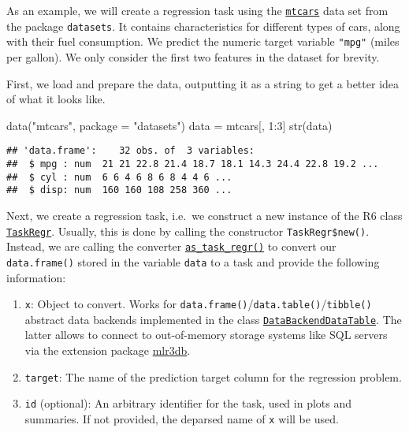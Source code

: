 \documentclass[
]{scrbook}
\newenvironment{Shaded}{\begin{snugshade}}{\end{snugshade}}
\newcommand{\AttributeTok}[1]{\textcolor[rgb]{0.77,0.63,0.00}{#1}}
\newcommand{\DecValTok}[1]{\textcolor[rgb]{0.00,0.00,0.81}{#1}}
\newcommand{\FunctionTok}[1]{\textcolor[rgb]{0.00,0.00,0.00}{#1}}
\newcommand{\NormalTok}[1]{#1}
\newcommand{\OtherTok}[1]{\textcolor[rgb]{0.56,0.35,0.01}{#1}}
\newcommand{\SpecialCharTok}[1]{\textcolor[rgb]{0.00,0.00,0.00}{#1}}
\newcommand{\StringTok}[1]{\textcolor[rgb]{0.31,0.60,0.02}{#1}}
\providecommand{\tightlist}{%
  \setlength{\itemsep}{0pt}\setlength{\parskip}{0pt}}
\renewenvironment{Shaded} {\begin{snugshade}\small} {\end{snugshade}}
\begin{document}
As an example, we will create a regression task using the \href{https://www.rdocumentation.org/packages/datasets/topics/mtcars}{\texttt{mtcars}} data set from the package \texttt{datasets}.
It contains characteristics for different types of cars, along with their fuel consumption.
We predict the numeric target variable \texttt{"mpg"} (miles per gallon).
We only consider the first two features in the dataset for brevity.

First, we load and prepare the data, outputting it as a string to get a better idea of what it looks like.

\begin{Shaded}
\begin{Highlighting}[]
\FunctionTok{data}\NormalTok{(}\StringTok{"mtcars"}\NormalTok{, }\AttributeTok{package =} \StringTok{"datasets"}\NormalTok{)}
\NormalTok{data }\OtherTok{=}\NormalTok{ mtcars[, }\DecValTok{1}\SpecialCharTok{:}\DecValTok{3}\NormalTok{]}
\FunctionTok{str}\NormalTok{(data)}
\end{Highlighting}
\end{Shaded}

\begin{verbatim}
## 'data.frame':    32 obs. of  3 variables:
##  $ mpg : num  21 21 22.8 21.4 18.7 18.1 14.3 24.4 22.8 19.2 ...
##  $ cyl : num  6 6 4 6 8 6 8 4 4 6 ...
##  $ disp: num  160 160 108 258 360 ...
\end{verbatim}

Next, we create a regression task, i.e.~we construct a new instance of the R6 class \href{https://mlr3.mlr-org.com/reference/TaskRegr.html}{\texttt{TaskRegr}}.
Usually, this is done by calling the constructor \texttt{TaskRegr\$new()}.
Instead, we are calling the converter \href{https://mlr3.mlr-org.com/reference/as_task_regr.html}{\texttt{as\_task\_regr()}} to convert our \texttt{data.frame()} stored in the variable \texttt{data} to a task and provide the following information:

\begin{enumerate}
\def\labelenumi{\arabic{enumi}.}
\tightlist
\item
  \texttt{x}: Object to convert. Works for \texttt{data.frame()}/\texttt{data.table()}/\texttt{tibble()} abstract data backends implemented in the class \href{https://mlr3.mlr-org.com/reference/DataBackendDataTable.html}{\texttt{DataBackendDataTable}}.
  The latter allows to connect to out-of-memory storage systems like SQL servers via the extension package \href{https://mlr3db.mlr-org.com}{mlr3db}.
\item
  \texttt{target}: The name of the prediction target column for the regression problem.
\item
  \texttt{id} (optional): An arbitrary identifier for the task, used in plots and summaries.
  If not provided, the deparsed name of \texttt{x} will be used.
\end{enumerate}
\end{document}
